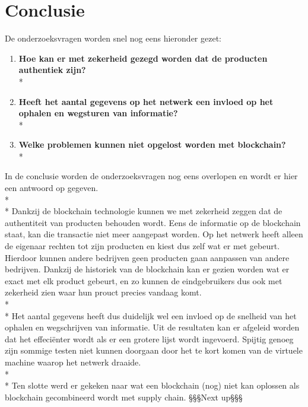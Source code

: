 
\chapter{Conclusie}
\label{ch:conclusie}

De onderzoeksvragen worden snel nog eens hieronder gezet:
\begin{enumerate}
	\item \textbf{Hoe kan er met zekerheid gezegd worden dat de producten authentiek zijn?}\\*
	\item \textbf{Heeft het aantal gegevens op het netwerk een invloed op het ophalen en wegsturen van informatie?}\\*
	\item \textbf{Welke problemen kunnen niet opgelost worden met blockchain?}\\*
\end{enumerate}

In de conclusie worden de onderzoeksvragen nog eens overlopen en wordt er hier een antwoord op gegeven.\\*\\*
Dankzij de blockchain technologie kunnen we met zekerheid zeggen dat de authentiteit van producten behouden wordt. Eens de informatie op de blockchain staat, kan die transactie niet meer aangepast worden. Op het netwerk heeft alleen de eigenaar rechten tot zijn producten en kiest dus zelf wat er met gebeurt. Hierdoor kunnen andere bedrijven geen producten gaan aanpassen van andere bedrijven. Dankzij de historiek van de blockchain kan er gezien worden wat er exact met elk product gebeurt, en zo kunnen de eindgebruikers dus ook met zekerheid zien waar hun prouct precies vandaag komt.\\*\\*
Het aantal gegevens heeft dus duidelijk wel een invloed op de snelheid van het ophalen en wegschrijven van informatie. Uit de resultaten kan er afgeleid worden dat het effeciënter wordt als er een grotere lijst wordt ingevoerd. Spijtig genoeg zijn sommige testen niet kunnen doorgaan door het te kort komen van de virtuele machine waarop het netwerk draaide.\\*\\*
Ten slotte werd er gekeken naar wat een blockchain (nog) niet kan oplossen als blockchain gecombineerd wordt met supply chain. §§§Next up§§§
